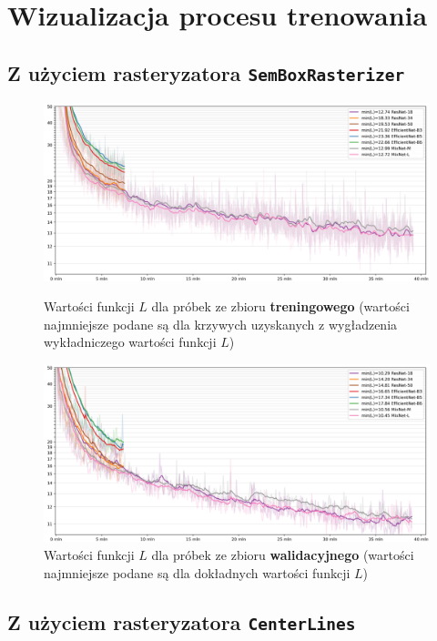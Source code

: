 \newpage

\section{Wizualizacja procesu trenowania}
\subsection{Z użyciem rasteryzatora \texttt{SemBoxRasterizer}}
\begin{figure}[h!]
    \centering
    \includegraphics[width=\linewidth]{loss_sembox_train.png}
    \caption{Wartości funkcji $L$ dla próbek ze zbioru \textbf{treningowego} (wartości najmniejsze podane są dla krzywych uzyskanych z wygładzenia wykładniczego wartości funkcji $L$)}
    \vspace*{1cm}
    \includegraphics[width=\linewidth]{loss_sembox_val.png}
    \caption{Wartości funkcji $L$ dla próbek ze zbioru \textbf{walidacyjnego} (wartości najmniejsze podane są dla dokładnych wartości funkcji $L$)}
\end{figure}

\newpage

\subsection{Z użyciem rasteryzatora \texttt{CenterLines}}
\vspace*{0cm}

